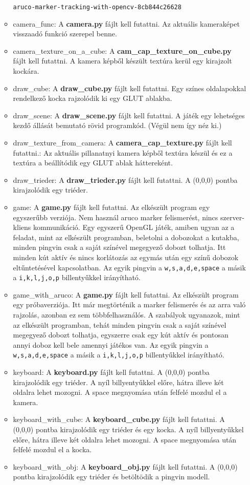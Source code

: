 \begin{itemize}
\begin{itemize}
\texttt{aruco-marker-tracking-with-opencv-8cb844c26628}
\item camera\_func:
A \textbf{camera.py} fájlt kell futattni.
Az aktuális kameraképet visszaadó funkció szerepel benne. 
\item camera\_texture\_on\_a\_cube:
A \textbf{cam\_cap\_texture\_on\_cube.py} fájlt kell futattni.
A kamera képből készült textúra kerül egy kirajzolt kockára.
\item draw\_cube:
A \textbf{draw\_cube.py} fájlt kell futattni.
Egy színes oldalapokkal rendelkező kocka rajzolódik ki egy GLUT ablakba.
\item draw\_scene:
A \textbf{draw\_scene.py} fájlt kell futattni.
A játék egy lehetséges kezdő állását bemutató rövid programkód.
(Végül nem így néz ki.)
\item draw\_texture\_from\_camera:
A \textbf{camera\_cap\_texture.py} fájlt kell futattni.:
Az aktuális pillanatnyi kamera képből textúra készül és ez a 
textúra a beállítódik egy GLUT ablak háttereként. 
\item draw\_trieder:
A \textbf{draw\_trieder.py} fájlt kell futattni.
A (0,0,0) pontba kirajzolódik egy triéder.
\item game:
A \textbf{game.py} fájlt kell futattni.
Az elkészült program egy egyszerűbb verziója. Nem használ aruco marker felismerést, nincs szerver-kliens kommunikáció.
Egy egyszerű OpenGL játék, amiben ugyan az a feladat, mint az elkészült programban, beletolni a dobozokat a kutakba, minden pingvin csak a saját színével megegyező dobozt tolhatja.
Itt minden kút aktív és nincs korlátozás az egymás után egy színű dobozok eltűntetésével kapcsolatban.
Az egyik pingvin a \texttt{w,s,a,d,e,space} a másik a \texttt{i,k,l,j,o,p} billentyűkkel irányítható.
\item game\_with\_aruco:
A \textbf{game.py} fájlt kell futattni.
Az elkészült program egy próbaverziója. Itt már megtörténik a marker felismerés és az arra való rajzolás, azonban ez sem többfelhasználós.
A szabályok ugyanazok, mint az elkészült programban, tehát minden pingvin csak a saját színével megegyező dobozt tolhatja, egyszerre csak egy kút aktív és
pontosan annyi doboz kell bele amennyi játékos van.
Az egyik pingvin a \texttt{w,s,a,d,e,space} a másik a \texttt{i,k,l,j,o,p} billentyűkkel irányítható.
\item keyboard:
A \textbf{keyboard.py} fájlt kell futattni.
A (0,0,0) pontba kirajzolódik egy triéder. A nyíl billyentyűkkel előre, hátra illeve 
két oldalra lehet mozogni.
A space megnyomása után felfelé mozdul el a kamera.
\item keyboard\_with\_cube:
A \textbf{keyboard\_cube.py} fájlt kell futattni.
A (0,0,0) pontba kirajzolódik egy triéder és egy kocka. A nyíl billyentyűkkel előre, hátra illeve két oldalra lehet mozogni.
A space megnyomása után felfelé mozdul el a kocka.
\item keyboard\_with\_obj:
A \textbf{keyboard\_obj.py} fájlt kell futattni.
A (0,0,0) pontba kirajzolódik egy triéder és betöltödik a pingvin modell.


\end{itemize}
\end{itemize}
